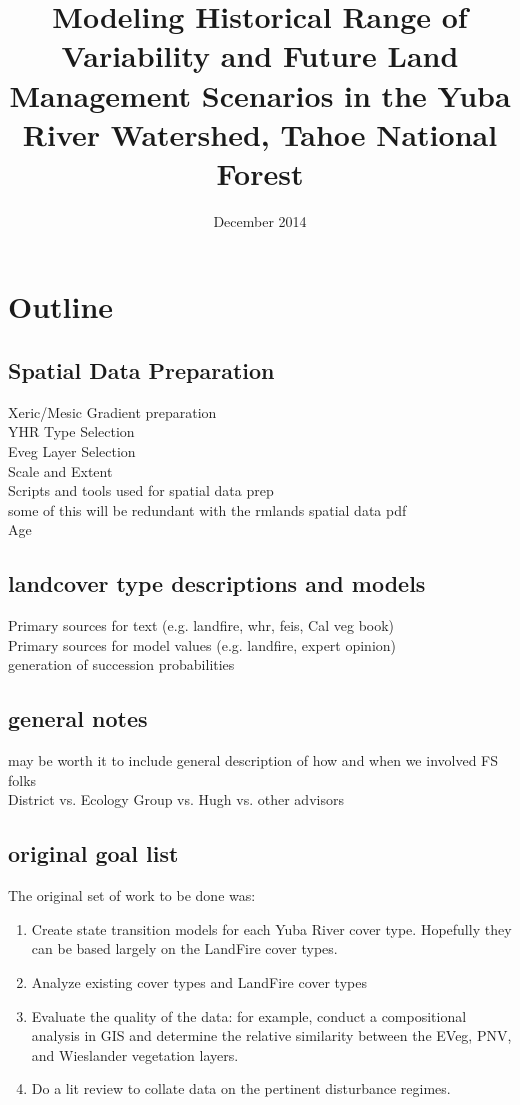 \documentclass{book}
\begin{document}
\title{Modeling Historical Range of Variability and Future Land Management Scenarios in the Yuba River Watershed, Tahoe National Forest}
\date{December 2014}

\section{Outline}
\subsection{Spatial Data Preparation}
Xeric/Mesic Gradient preparation\\
YHR Type Selection\\
Eveg Layer Selection\\
Scale and Extent\\
Scripts and tools used for spatial data prep\\
some of this will be redundant with the rmlands spatial data pdf\\
Age

\subsection{landcover type descriptions and models}
Primary sources for text (e.g. landfire, whr, feis, Cal veg book)\\
Primary sources for model values (e.g. landfire, expert opinion)\\
generation of succession probabilities\\

\subsection{general notes}
may be worth it to include general description of how and when we involved FS folks\\
District vs. Ecology Group vs. Hugh vs. other advisors\\

\subsection{original goal list}

The original set of work to be done was:
\begin{enumerate}
\item{Create state transition models for each Yuba River cover type. Hopefully they can be based largely on the LandFire cover types.}
\item{Analyze existing cover types and LandFire cover types}
\item{Evaluate the quality of the data: for example, conduct a compositional analysis in GIS and determine the relative similarity between the EVeg, PNV, and Wieslander vegetation layers.}
\item{Do a lit review to collate data on the pertinent disturbance regimes.}
\end{enumerate}
\end{document}
